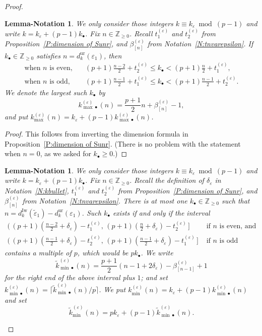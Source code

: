 \documentclass[12pt]{amsart}
\newtheorem{lemmanotation}[subsection]{Lemma-Notation}
\theoremstyle{definition}
\numberwithin{equation}{subsection}
\def\ZZ{\mathbb{Z}}
\newcommand{\Iw}{\mathrm{Iw}}
\newcommand{\unr}{\mathrm{ur}}
\begin{document}
\begin{proof}
\begin{lemmanotation}
\label{L:extremal ks_part2}
We only consider those integers $k \equiv k_\varepsilon \bmod{(p-1)}$ and write $k=k_\varepsilon+(p-1)k_{\bullet}$. Fix $n\in \ZZ_{ \geq 0}$.
Recall $t_1^{(\varepsilon)}$ and $t_2^{(\varepsilon)}$ from Proposition~\ref{P:dimension of Sunr}, and $\beta_{[n]}^{(\varepsilon)}$ from Notation~\ref{N:tnvarepsilon}.
If $k_\bullet \in \ZZ_{\geq 0}$ satisfies $n = d_{k}^\unr(\varepsilon_1)$, then
\begin{align*}
\textrm{when } n \textrm{ is even,}&\quad (p+1)\tfrac {n-2}2 + t_2^{(\varepsilon)} \leq  k_\bullet  < (p+1)\tfrac {n}2 + t_1^{(\varepsilon)},
\\
\textrm{when } n \textrm{ is odd,}&\quad (p+1)\tfrac {n-1}2 + t_1^{(\varepsilon)} \leq k_\bullet < (p+1)\tfrac {n-1}2 + t_2^{(\varepsilon)}.
\end{align*}
We denote the largest such $k_\bullet$ by  $$k_{{\max}\bullet}^{(\varepsilon)}(n)=\frac{p+1}2 n + \beta_{[n]}^{(\varepsilon)}-1,$$
and put $k_{\max}^{(\varepsilon)}(n) = k_\varepsilon + (p-1)k_{{\max}\bullet}^{(\varepsilon)}(n)$.
\end{lemmanotation}
\begin{proof}
This follows from inverting the dimension formula in Proposition~\ref{P:dimension of Sunr}. (There is no problem with the statement when $n=0$, as we asked for $k_\bullet \geq 0$.)
\end{proof}

\begin{lemmanotation}
\label{L:extremal ks_part3}
We only consider those integers $k \equiv k_\varepsilon \bmod{(p-1)}$ and write $k=k_\varepsilon+(p-1)k_{\bullet}$. Fix $n\in \ZZ_{ \geq 0}$.
Recall the definition of $\delta_\varepsilon$ in Notation~\ref{N:kbullet}, $t_1^{(\varepsilon)}$ and $t_2^{(\varepsilon)}$ from Proposition~\ref{P:dimension of Sunr}, and $\beta_{[n]}^{(\varepsilon)}$ from Notation~\ref{N:tnvarepsilon}.
There is at most one $k_\bullet \in \ZZ_{\geq 0}$ such that  $n = d_{k}^\Iw(\tilde \varepsilon_1)-d_{k}^\unr(\varepsilon_1)$.
Such $k_\bullet$ exists if and only if the interval
\begin{align}
\label{E:condition on kmin}
\big(\,(p+1)( \tfrac {n-2}2 + \delta_\varepsilon)  -t_1^{(\varepsilon)} , \, (p+1)( \tfrac n2 + \delta_\varepsilon)  -t_2^{(\varepsilon)}\, \big]& \textrm{ if }n \textrm{ is even, and}
\\
\nonumber \big(\,(p+1)( \tfrac {n-1}2 + \delta_\varepsilon)  -t_2^{(\varepsilon)} , \, (p+1)( \tfrac {n-1}2 + \delta_\varepsilon)  -t_1^{(\varepsilon)}\, \big] &\textrm{ if }n \textrm{ is odd}
\end{align}
contains a multiple of $p$, which would be $pk_\bullet$. We write $$\tilde k_{{\min}\bullet}^{(\varepsilon)}(n)= \frac{p+1}2(n-1+2\delta_\varepsilon) - \beta_{[n-1]}^{(\varepsilon)}+1$$ for the \emph{right end} of the above interval plus $1$; and set $k_{{\min}\bullet}^{(\varepsilon)}(n) = \lceil \tilde k_{{\min}\bullet}^{(\varepsilon)} (n)/ p\rceil$.
We put $k_{\min}^{(\varepsilon)}(n) = k_\varepsilon + (p-1)k_{{\min}\bullet}^{(\varepsilon)}(n)$ and set
$$\tilde k_{{\min}}^{(\varepsilon)}(n)  = pk_\varepsilon + (p-1)\tilde k_{{\min}\bullet}^{(\varepsilon)}(n).
$$


\end{lemmanotation}
\end{proof}
\end{document}
